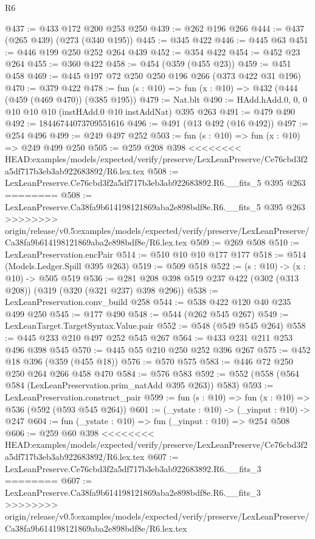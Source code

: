 \begin{lexlean}{R6}
\begin{coremodule}
{{{{{{{{{{{{{{{@437 := @433 @172 @200 @253 @250
@439 := @262 @196 @266
@444 := @437 (@265 @439) (@273 (@340 @195))
@445 := @345 @422
@446 := @445 @63
@451 := @446 @199 @250 @252 @264 @439
@452 := @354 @422
@454 := @452 @23 @264
@455 := @360 @422
@458 := @454 (@359 (@455 @23))
@459 := @451 @458
@469 := @445 @197 @72 @250 @250 @196 @266 (@373 @422 @31 @196)
@470 := @379 @422
@478 := fun (s : @10) => fun (x : @10) => @432 (@444 (@459 (@469 @470)) (@385 @195))
@479 := Nat.blt
@490 := HAdd.hAdd.{0, 0, 0} @10 @10 @10 (instHAdd.{0} @10 instAddNat) @395 @263
@491 := @479 @490
@492 := 18446744073709551616
@496 := @491 (@13 @492 (@16 @492))
@497 := @254 @496
@499 := @249 @497 @252
@503 := fun (s : @10) => fun (x : @10) => @249 @499 @250
@505 := @259 @208 @398
<<<<<<<< HEAD:examples/models/expected/verify/preserve/LexLeanPreserve/Ce76cbd3f2a5df717b3eb3ab922683892/R6.lex.tex
@508 := LexLeanPreserve.Ce76cbd3f2a5df717b3eb3ab922683892.R6.__fits_5 @395 @263
========
@508 := LexLeanPreserve.Ca38fa9b614198121869aba2e898bdf8e.R6.__fits_5 @395 @263
>>>>>>>> origin/release/v0.5:examples/models/expected/verify/preserve/LexLeanPreserve/Ca38fa9b614198121869aba2e898bdf8e/R6.lex.tex
@509 := @269 @508
@510 := LexLeanPreservation.encPair
@514 := @510 @10 @10 @177 @177
@518 := @514 (Models.Ledger.Spill @395 @263)
@519 := @509 @518
@522 := (s : @10) -> (x : @10) -> @505 @519
@536 := @281 @208 @398 @519 @237 @422 (@302 (@313 @208)) (@319 (@320 (@321 @237) @398 @296))
@538 := LexLeanPreservation.conv_build @258
@544 := @538 @422 @120 @40 @235 @499 @250
@545 := @177 @490
@548 := @544 (@262 @545 @267)
@549 := LexLeanTarget.TargetSyntax.Value.pair
@552 := @548 (@549 @545 @264)
@558 := @445 @233 @210 @497 @252 @545 @267
@564 := @433 @231 @211 @253 @496 @398 @545
@570 := @445 @55 @210 @250 @252 @396 @267
@575 := @452 @18 @396 (@359 (@455 @18))
@576 := @570 @575
@583 := @446 @72 @250 @250 @264 @266 @458 @470
@584 := @576 @583
@592 := @552 (@558 (@564 @584 (LexLeanPreservation.prim_natAdd @395 @263)) @583)
@593 := LexLeanPreservation.construct_pair
@599 := fun (s : @10) => fun (x : @10) => @536 (@592 (@593 @545 @264))
@601 := (_ystate : @10) -> (_yinput : @10) -> @247
@604 := fun (_ystate : @10) => fun (_yinput : @10) => @254 @508
@606 := @259 @60 @398
<<<<<<<< HEAD:examples/models/expected/verify/preserve/LexLeanPreserve/Ce76cbd3f2a5df717b3eb3ab922683892/R6.lex.tex
@607 := LexLeanPreserve.Ce76cbd3f2a5df717b3eb3ab922683892.R6.__fits_3
========
@607 := LexLeanPreserve.Ca38fa9b614198121869aba2e898bdf8e.R6.__fits_3
>>>>>>>> origin/release/v0.5:examples/models/expected/verify/preserve/LexLeanPreserve/Ca38fa9b614198121869aba2e898bdf8e/R6.lex.tex
}}}}}}}}}}}}}}}
\end{coremodule}
\end{lexlean}
